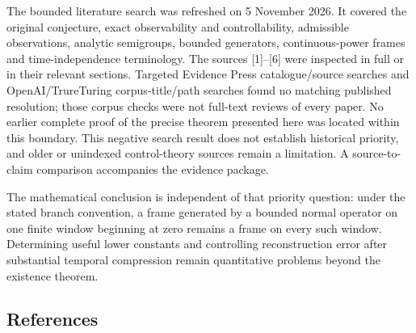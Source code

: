 \documentclass[
  11pt,
]{article}
\begin{document}
The bounded literature search was refreshed on 5 November 2026. It
covered the original conjecture, exact observability and
controllability, admissible observations, analytic semigroups, bounded
generators, continuous-power frames and time-independence terminology.
The sources {[}1{]}--{[}6{]} were inspected in full or in their relevant
sections. Targeted Evidence Press catalogue/source searches and
OpenAI/TrureTuring corpus-title/path searches found no matching
published resolution; those corpus checks were not full-text reviews of
every paper. No earlier complete proof of the precise theorem presented
here was located within this boundary. This negative search result does
not establish historical priority, and older or unindexed control-theory
sources remain a limitation. A source-to-claim comparison accompanies
the evidence package.

The mathematical conclusion is independent of that priority question:
under the stated branch convention, a frame generated by a bounded
normal operator on one finite window beginning at zero remains a frame
on every such window. Determining useful lower constants and controlling
reconstruction error after substantial temporal compression remain
quantitative problems beyond the existence theorem.

\subsection{References}\label{references}
\end{document}
